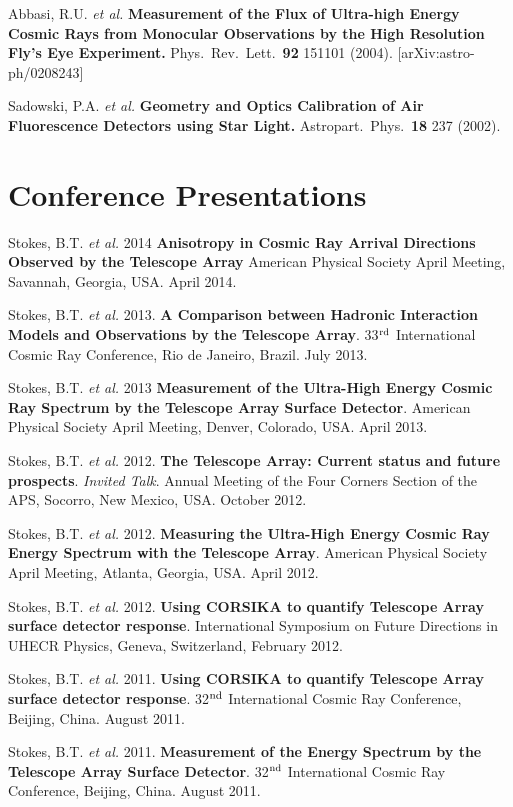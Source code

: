 \begin{resume}
Abbasi, R.U. {\it et al.}  {\bf Measurement of the Flux of Ultra-high Energy 
Cosmic Rays from Monocular Observations by the High Resolution Fly's Eye 
Experiment.}  Phys.\ Rev.\ Lett.\ {\bf 92} 151101 (2004). 
[arXiv:astro-ph/0208243]

Sadowski, P.A. {\it et al.} {\bf Geometry and Optics Calibration of Air 
Fluorescence Detectors using Star Light.}  Astropart.\ Phys.\ {\bf 18} 237 
(2002).

\section{\sc Conference Presentations}

Stokes, B.T. {\it et al.} 2014 {\bf  Anisotropy in Cosmic Ray Arrival Directions Observed by the Telescope Array} American Physical Society April Meeting, Savannah, Georgia, USA. April 2014.

Stokes, B.T. {\it et al.} 2013. {\bf A Comparison between Hadronic Interaction Models and Observations by the Telescope Array}. 33$^{\rm rd}$ International Cosmic Ray Conference, Rio de Janeiro, Brazil. July 2013.

Stokes, B.T. {\it et al.} 2013 {\bf Measurement of the Ultra-High Energy Cosmic Ray Spectrum by the Telescope Array Surface Detector}. American Physical Society April Meeting, Denver, Colorado, USA. April 2013.

Stokes, B.T. {\it et al.} 2012. {\bf The Telescope Array: Current status and future prospects}.  {\it Invited Talk}. Annual Meeting of the Four Corners Section of the APS, Socorro, New Mexico, USA. October 2012.

Stokes, B.T. {\it et al.} 2012. {\bf Measuring the Ultra-High Energy Cosmic Ray Energy Spectrum with the Telescope Array}. American Physical Society April Meeting, Atlanta, Georgia, USA. April 2012. 

Stokes, B.T. {\it et al.} 2012. {\bf Using CORSIKA to quantify Telescope 
Array surface detector response}. International Symposium on Future Directions
in UHECR Physics, Geneva, Switzerland, February 2012.

Stokes, B.T. {\it et al.} 2011. {\bf Using CORSIKA to quantify Telescope 
Array surface detector response}. 32$^{\rm nd}$ International Cosmic Ray 
Conference, Beijing, China. August 2011.

Stokes, B.T. {\it et al.} 2011. {\bf Measurement of the Energy Spectrum by the 
Telescope Array Surface Detector}. 32$^{\rm nd}$ International Cosmic Ray 
Conference, Beijing, China. August 2011.


\end{resume}
